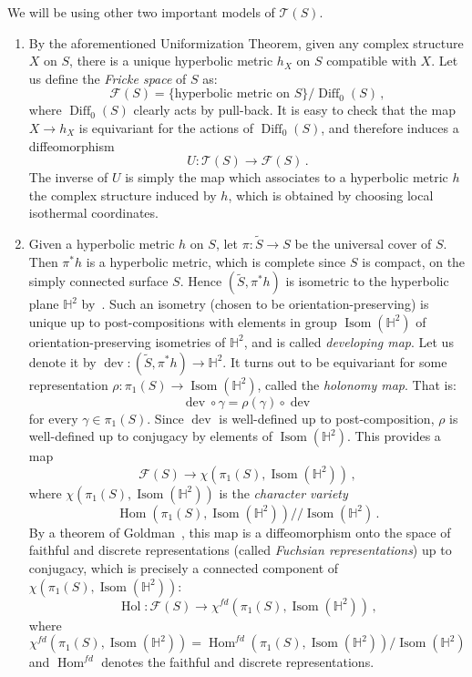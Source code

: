 \documentclass[11pt]{article}
\theoremstyle{definition}
\numberwithin{equation}{section}
\numberwithin{figure}{section}
\numberwithin{table}{section}
\newcommand{\Teich}{\mathcal{T}}
\newcommand{\Hyp}{\mathbb{H}}
\DeclareMathOperator{\Diffeo}{Diff}
\DeclareMathOperator{\dev}{dev}
\DeclareMathOperator{\Isom}{Isom}
\DeclareMathOperator{\Hol}{Hol}
\DeclareMathOperator{\Hom}{Hom}
\begin{document}
We will be using other two important models of $\Teich(S)$.
\begin{enumerate}
\item By the aforementioned Uniformization Theorem, given any complex structure $X$ on $S$, there is a unique hyperbolic metric $h_X$ on $S$ compatible with $X$. Let us define the \emph{Fricke space} of $S$ as:
\[
\mathcal F(S)=\{\text{hyperbolic metric on }S\}/\Diffeo_0(S)\,,
\]
where $\Diffeo_0(S)$ clearly acts by pull-back. It is easy to check that the map $X\to h_X$ is equivariant for the actions of $\Diffeo_0(S)$, and therefore induces a diffeomorphism
\begin{equation}
U:\Teich(S)\to\mathcal F(S)\,.
\end{equation}
The inverse of $U$ is simply the map which associates to a hyperbolic metric $h$ the complex structure induced by $h$, which is obtained by choosing local isothermal coordinates.
\item Given a hyperbolic metric $h$ on $S$, let $\pi:\widetilde S\to S$ be the universal cover of $S$. Then $\pi^*h$ is a hyperbolic metric, which is complete since $S$ is compact, on the simply connected surface $S$. Hence $(\widetilde S,\pi^*h)$ is isometric to the hyperbolic plane $\Hyp^2$ by~\cite[Theorem~8.6.2]{opac-b1124711}. Such an isometry (chosen to be orientation-preserving) is unique up to post-compositions with elements in group $\Isom(\Hyp^2)$ of orientation-preserving isometries of $\Hyp^2$, and is called \emph{developing map}. Let us denote it by $\dev:(\widetilde S,\pi^*h)\to\Hyp^2$. It turns out to be equivariant for some representation $\rho:\pi_1(S)\to\Isom(\Hyp^2)$, called the \emph{holonomy map}. That is:
\[
\dev\circ\gamma=\rho(\gamma)\circ\dev
\]
for every $\gamma\in\pi_1(S)$. Since $\dev$ is well-defined up to post-composition, $\rho$ is well-defined up to conjugacy by elements of $\Isom(\Hyp^2)$. This provides a map
\[
\mathcal F(S)\to \chi\left(\pi_1(S),\Isom(\Hyp^2)\right)\,,
\]
where $\chi(\pi_1(S),\Isom(\Hyp^2))$ is the \emph{character variety}
\[
\Hom\left(\pi_1(S),\Isom(\Hyp^2)\right)/\!\!/\Isom(\Hyp^2)\,.
\]
By a theorem of Goldman~\cite{goldmanthesis}, this map is a diffeomorphism onto the space of faithful and discrete representations (called \emph{Fuchsian representations}) up to conjugacy, which is precisely a connected component of $\chi(\pi_1(S),\Isom(\Hyp^2))$:
\begin{equation}
\Hol:\mathcal F(S)\to \chi^{f\!d}\left(\pi_1(S),\Isom(\Hyp^2)\right)\,,
\end{equation}
where
\[
\chi^{f\!d}\left(\pi_1(S),\Isom(\Hyp^2)\right)=\Hom^{f\!d}\left(\pi_1(S),\Isom(\Hyp^2)\right)/\Isom(\Hyp^2)
\]
and $\Hom^{f\!d}$ denotes the faithful and discrete representations.
\end{enumerate}
\end{document}
